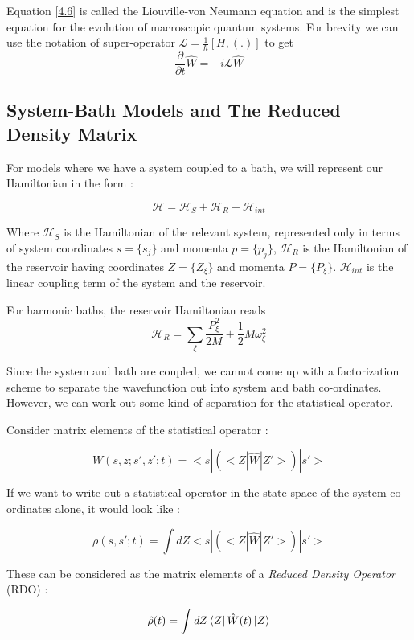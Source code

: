 Equation \ref{4.6} is called the Liouville-von Neumann equation and is the simplest equation for the evolution of macroscopic quantum systems. For brevity we can use the notation of super-operator $\mathcal{L} = \frac{1}{\hbar}[H, (.)]$ to get $$\frac{\partial}{\partial t} \hat{W} = -i \mathcal{L} \hat{W}$$

\subsection{System-Bath Models and The Reduced Density Matrix}

For models where we have a system coupled to a bath, we will represent our Hamiltonian in the form : 

\begin{equation} \label{4.7}
    \mathcal{H} = \mathcal{H}_S + \mathcal{H}_R + \mathcal{H}_{int}
\end{equation}

Where $\mathcal{H}_S$ is the Hamiltonian of the relevant system, represented only in terms of system coordinates $s = \{s_j\}$ and momenta $p = \{p_j\}$, $\mathcal{H}_R$ is the Hamiltonian of the reservoir having coordinates $Z = \{Z_{\xi}\}$ and momenta $P = \{P_{\xi}\}$. $\mathcal{H}_{int}$ is the linear coupling term of the system and the reservoir. 

For harmonic baths, the reservoir Hamiltonian reads $$\mathcal{H}_{R} = \sum_{\xi} \frac{P_{\xi}^2}{2M} + \frac{1}{2}M \omega_{\xi}^2$$

Since the system and bath are coupled, we cannot come up with a factorization scheme to separate the wavefunction out into system and bath co-ordinates. However, we can work out some kind of separation for the statistical operator.

Consider matrix elements of the statistical operator :

$$W(s, z ; s', z' ; t) = <s|(<Z|\hat{W}|Z'>)|s'>$$

If we want to write out a statistical operator in the state-space of the system co-ordinates alone, it would look like :

\begin{equation}
\rho(s, s' ; t) = \int dZ <s|(<Z|\hat{W}|Z'>)|s'>
\end{equation}

These can be considered as the matrix elements of a \emph{Reduced Density Operator} (RDO) :

\begin{equation}
    \hat{\rho}(t) = \int dZ \bra{Z}\hat{W}(t)\ket{Z} 
\end{equation}


